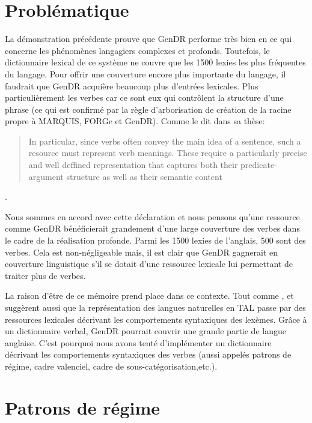 \section{Problématique}\label{problema}

La démonstration précédente prouve que GenDR performe très bien en ce qui concerne les phénomènes langagiers complexes et profonds. Toutefois, le dictionnaire lexical de ce système ne couvre que les 1500 lexies les plus fréquentes du langage. Pour offrir une couverture encore plus importante du langage, il faudrait que GenDR acquière beaucoup plus d'entrées lexicales. Plus particulièrement les verbes car ce sont eux qui contrôlent la structure d'une phrase (ce qui est confirmé par la règle d'arborisation de création de la racine propre à MARQUIS, FORGe et GenDR). Comme \cite{SchulerVerbnetBroadcoverageComprehensive2005} le dit dans sa thèse:

\begin{quotation} In particular, since verbs often convey the main idea of a sentence, such a resource must represent verb meanings. These require a particularly precise and well deffined representation that captures both their predicate-argument structure as well as their semantic content\end{quotation}.

Nous sommes en accord avec cette déclaration et nous pensons qu'une ressource comme GenDR bénéficierait grandement d'une large couverture des verbes dans le cadre de la réalisation profonde. Parmi les 1500 lexies de l'anglais, 500 sont des verbes. Cela est non-négligeable mais, il est clair que GenDR gagnerait en couverture linguistique s'il se dotait d'une ressource lexicale lui permettant de traiter plus de verbes.

La raison d'être de ce mémoire prend place dans ce contexte. Tout comme \cite{SchulerVerbnetBroadcoverageComprehensive2005}, \cite{Korhonenlargesubcategorizationlexicon2006} et \cite{MESSIANT08.142} suggèrent aussi que la représentation des langues naturelles en \ac{TAL} passe par des ressources lexicales décrivant les comportements syntaxiques des lexèmes. Grâce à un dictionnaire verbal, GenDR pourrait couvrir une grande partie de langue anglaise. C'est pourquoi nous avons tenté d'implémenter un dictionnaire décrivant les comportements syntaxiques des verbes (aussi appelés patrons de régime, cadre valenciel, cadre de sous-catégorisation,etc.).

\section{Patrons de régime}\label{sectiongp}

